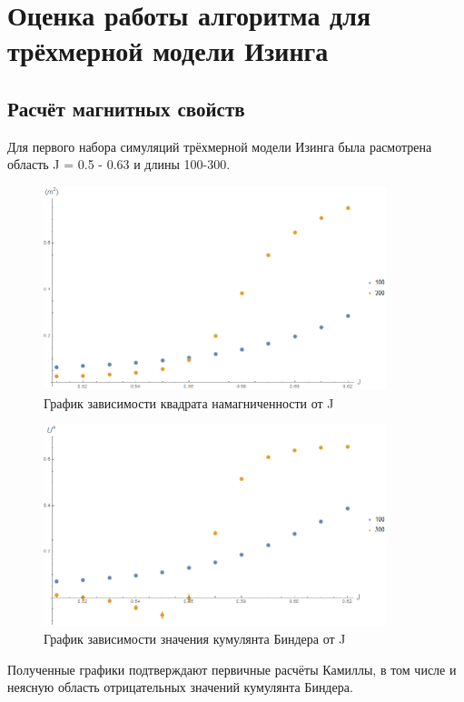 \section{Оценка работы алгоритма для трёхмерной модели Изинга}

\subsection{Расчёт магнитных свойств}

Для первого набора симуляций трёхмерной модели Изинга была расмотрена область J = 0.5 - 0.63 и длины 100-300.

\begin{figure}[!h]
    \centering
    \includegraphics[width=100mm]{Sections/Images/m2_3D_50to60.png}
    \caption{График зависимости квадрата намагниченности от J}
    \label{fig:m2_3D}
\end{figure}

\begin{figure}[!h]
    \centering
    \includegraphics[width=100mm]{Sections/Images/U4_3D_50to60.png}
    \caption{График зависимости значения кумулянта Биндера от J}
    \label{fig:U4_3D}
\end{figure}

Полученные графики подтверждают первичные расчёты Камиллы, в том числе и неясную область отрицательных значений кумулянта Биндера.